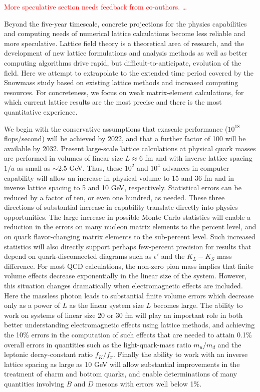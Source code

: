 \textcolor{red}{More speculative section needs feedback from co-authors. \ldots}

Beyond the five-year timescale, concrete projections for the physics
capabilities and computing needs of numerical lattice calculations become less
reliable and more speculative.  Lattice field theory is a theoretical area of
research, and the development of new lattice formulations and analysis methods
as well as better computing algorithms drive rapid, but
difficult-to-anticipate, evolution of the field.  Here we attempt to
extrapolate to the extended time period covered by the Snowmass study based on
existing lattice methods and increased computing resources.  For concreteness,
we focus on weak matrix-element calculations, for which current lattice
results are the most precise and there is the most quantitative experience.

We begin with the conservative assumptions that exascale performance
($10^{18}$ flops/second) will be achieved by 2022, and that a further factor
of 100 will be available by 2032.  Present large-scale lattice calculations at
physical quark masses are performed in volumes of linear size $L \approx 6$ fm
and with inverse lattice spacing $1/a$ as small as $\sim 2.5$ GeV.  Thus,
these $10^2$ and $10^4$ advances in computer capability will allow an increase
in physical volume to 15 and 36 fm and in inverse lattice spacing to 5 and 10
GeV, respectively.  Statistical errors can be reduced by a factor of ten, or
even one hundred, as needed.  These three directions of substantial increase
in capability translate directly into physics opportunities.  The large
increase in possible Monte Carlo statistics will enable a reduction in the
errors on many nucleon matrix elements to the percent level, and on quark
flavor-changing matrix elements to the sub-percent level.  Such increased
statistics will also directly support perhaps few-percent precision for
results that depend on quark-disconnected diagrams such as $\epsilon'$ and the
$K_L-K_S$ mass difference.  For most QCD calculations, the non-zero pion mass
implies that finite volume effects decrease exponentially in the linear size
of the system.  However, this situation changes dramatically when
electromagnetic effects are included.  Here the massless photon leads to
substantial finite volume errors which decrease only as a power of $L$ as the
linear system size $L$ becomes large.  The ability to work on systems of
linear size 20 or 30 fm will play an important role in both better
understanding electromagnetic effects using lattice methods, and achieving the
10\% errors in the computation of such effects that are needed to attain 0.1\%
overall errors in quantities such as the light-quark-mass ratio $m_u/m_d$ and
the leptonic decay-constant ratio $f_K/f_\pi$.  Finally the ability to work
with an inverse lattice spacing as large as 10 GeV will allow substantial
improvements in the treatment of charm and bottom quarks, and enable
determinations of many quantities involving $B$ and $D$ mesons with errors
well below 1\%.

